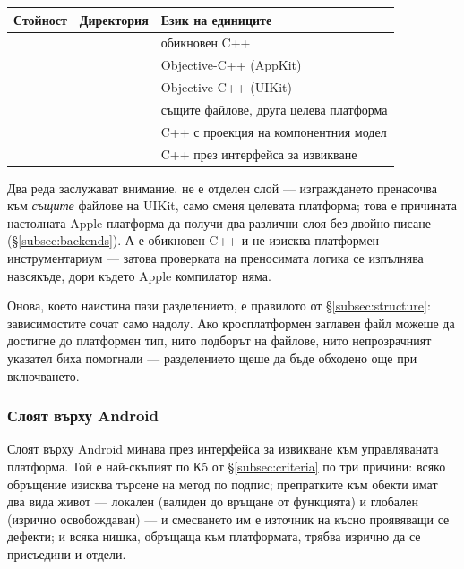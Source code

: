 \begin{center}
\begin{tabular}{@{}L{2.8cm}L{4.0cm}L{6.8cm}@{}}
\hline
\textbf{Стойност} & \textbf{Директория} & \textbf{Език на единиците} \\
\hline
{} &  & обикновен C++ \\
    &     & Objective-C++ (AppKit) \\
      &       & Objective-C++ (UIKit) \\
 &    & същите файлове, друга целева платформа \\
  &   & C++ с проекция на компонентния модел \\
  &   & C++ през интерфейса за извикване \\
\hline
\end{tabular}
\end{center}

Два реда заслужават внимание.  не е отделен слой --- изграждането
пренасочва към \emph{същите} файлове на UIKit, само сменя целевата платформа; това е
причината настолната Apple платформа да получи два различни слоя без двойно писане
(§\ref{subsec:backends}). А  е обикновен C++ и не изисква платформен
инструментариум --- затова проверката на преносимата логика се изпълнява навсякъде, дори
където Apple компилатор няма.

Онова, което наистина пази разделението, е правилото от §\ref{subsec:structure}:
зависимостите сочат само надолу. Ако кросплатформен заглавен файл можеше да достигне до
платформен тип, нито подборът на файлове, нито непрозрачният указател биха помогнали ---
разделението щеше да бъде обходено още при включването.

\subsubsection{Слоят върху Android}
Слоят върху Android минава през интерфейса за извикване към управляваната платформа. Той е
най-скъпият по К5 от §\ref{subsec:criteria} по три причини: всяко обръщение изисква
търсене на метод по подпис; препратките към обекти имат два вида живот --- локален (валиден
до връщане от функцията) и глобален (изрично освобождаван) --- и смесването им е източник на
късно проявяващи се дефекти; и всяка нишка, обръщаща към платформата, трябва изрично да се
присъедини и отдели.


